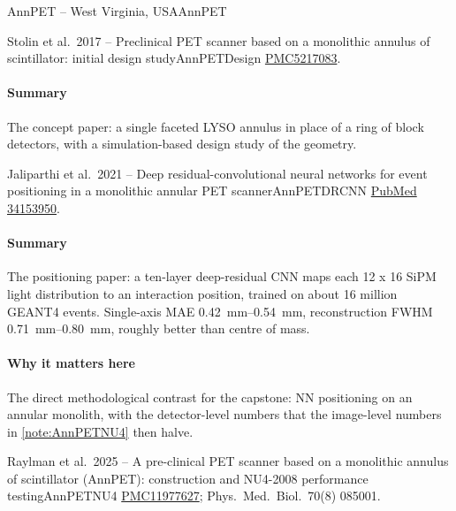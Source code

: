 \begin{programnote}{AnnPET -- West Virginia, USA}{AnnPET}
\begin{papernote}{Stolin et al.\ 2017 -- Preclinical PET scanner based on a monolithic annulus of scintillator: initial design study}{AnnPETDesign}
\href{https://pmc.ncbi.nlm.nih.gov/articles/PMC5217083/}{PMC5217083}.

\paragraph{Summary}
The concept paper: a single faceted LYSO annulus in place of a ring of block
detectors, with a simulation-based design study of the geometry.

\end{papernote}

\begin{papernote}{Jaliparthi et al.\ 2021 -- Deep residual-convolutional neural networks for event positioning in a monolithic annular PET scanner}{AnnPETDRCNN}
\href{https://pubmed.ncbi.nlm.nih.gov/34153950/}{PubMed 34153950}.

\paragraph{Summary}
The positioning paper: a ten-layer deep-residual CNN maps each 12 x 16 SiPM
light distribution to an interaction position, trained on about 16 million
GEANT4 events. Single-axis MAE \qtyrange{0.42}{0.54}{\milli\metre},
reconstruction FWHM \qtyrange{0.71}{0.80}{\milli\metre}, roughly 
better than centre of mass.

\paragraph{Why it matters here}
The direct methodological contrast for the capstone: NN positioning on an
annular monolith, with the detector-level numbers that the image-level
numbers in \ref{note:AnnPETNU4} then halve.

\end{papernote}

\begin{papernote}{Raylman et al.\ 2025 -- A pre-clinical PET scanner based on a monolithic annulus of scintillator (AnnPET): construction and NU4-2008 performance testing}{AnnPETNU4}
\href{https://pmc.ncbi.nlm.nih.gov/articles/PMC11977627/}{PMC11977627}; Phys.\ Med.\ Biol.\ 70(8) 085001.


\end{papernote}
\end{programnote}
